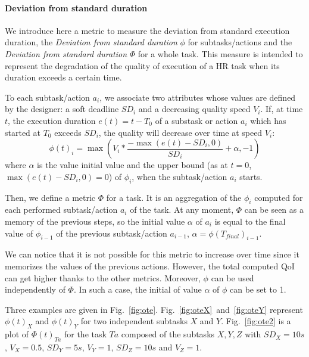 \documentclass[a4paper,11pt,twoside]{StyleThese}
\begin{document}
\paragraph{Deviation from standard duration}\label{subsubsec:ote}
We introduce here a metric to measure the deviation from standard execution duration, the \textit{Deviation from standard duration} $\phi$ for subtasks/actions and the \textit{Deviation from standard duration} $\Phi$ for a whole task. This measure is intended to represent the degradation of the quality of execution of a HR task when its duration exceeds a certain time. 

To each subtask/action $a_i$, we associate two attributes whose values are defined by the designer: a soft deadline $SD_i$ and a decreasing quality  speed $V_i$. 
If, at time $t$, the execution duration  $e(t) = t - T_0$ of a substask or action $a_i$ which has started at $T_0$ exceeds $SD_i$, the quality will decrease over time at speed $V_i$: 
\begin{equation}\label{eq:ote}
\phi(t)_i=\max\left( V_i*\frac{-\max(e(t)-SD_i,0)}{SD_i}+\alpha,-1\right)
\end{equation}
where $\alpha$ is the value initial value and the upper bound (as at $t=0$, $\max(e(t)-SD_i,0)=0$) of $\phi_i$, when the subtask/action $a_i$ starts.

Then, we define a metric $\Phi$ for a task. It is an aggregation of the $\phi_i$ computed for each performed subtask/action $a_i$ of the task. At any moment, $\Phi$ can be seen as a memory of the previous steps, so the initial value $\alpha$ of $a_i$ is equal to the final value of $\phi_{i-1}$ of the previous subtask/action $a_{i-1}$, $\alpha=\phi(T_{final})_{i-1}$.


We can notice that it is not possible for this metric to increase over time since it memorizes the values of the previous actions. However, the total computed QoI can get higher thanks to the other metrics. Moreover, $\phi$ can be used independently of $\Phi$. In such a case, the initial of value $\alpha$ of $\phi$ can be set to 1. 

Three examples are given in Fig.~\ref{fig:ote}. Fig.~\ref{fig:oteX}~and~\ref{fig:oteY} represent $\phi(t)_{X}$ and $\phi(t)_{Y}$ for two independent subtasks $X$ and $Y$. Fig.~\ref{fig:ote2} is a plot of $\Phi(t)_{Ta}$ for the task $Ta$ composed of the subtasks $X, Y, Z$ with $SD_X=10 s$, $V_X=0.5$, $SD_Y=5 s$, $V_Y=1$, $SD_Z=10 s$ and $V_Z=1$. 

\ifdefined{}
\else


\end{document}
